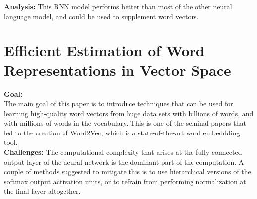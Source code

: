 \documentclass[11pt,a4paper]{article}
\begin{document}
  \textbf{Analysis:}
  This RNN model performs better than most of the other neural language model, and could be used to supplement word vectors.
  


\section{Efficient Estimation of Word Representations in Vector Space} %
\label{sec:efficient_estimation_of_word_representations_in_vector_space}

  \textbf{Goal:}\\
  The main goal of this paper is to introduce techniques that can be used for learning high-quality word vectors from huge data sets with billions of words, and with millions of words in the vocabulary. This is one of the seminal papers that led to the creation of Word2Vec, which is a state-of-the-art word embeddding tool. \cite{mikolov2013efficient}\\

  \textbf{Challenges:}
  The computational complexity that arises at the fully-connected output layer of the neural network is the dominant part of the computation. A couple of methods suggested to mitigate this is to use hierarchical versions of the softmax output activation units, or to refrain from performing normalization at the final layer altogether.
\end{document}
